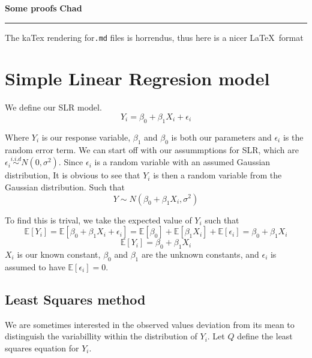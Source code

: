 \documentclass{article}
\begin{document}
 \hfill \textbf{\huge Some proofs}   \hfill  \textbf{\large 
	Chad } 
	\rule{19.5cm}{0.8pt} 


	The kaTex rendering for\verb|.md| files is horrendus, 
	thus here is a nicer \LaTeX \ format 

	
\section{Simple Linear Regresion model}
	
	We define our SLR model. 
\begin{equation}
 Y_i = \beta_0 + \beta_1X_i + \epsilon_i
\end{equation}
	
\noindent Where $Y_i$ is our response variable, $\beta_1$ and $\beta_0$ is both 
our parameters and $\epsilon_i$ is the random error term.
We can start off with our assummptions for SLR, 
which are $\epsilon_i \overset{i.i.d}{\sim} N(0, \sigma^2)$. Since $\epsilon_i$ is a
random variable with an assumed Gaussian distribution, It is obvious to see that $Y_i$ 
is then a random variable from the Gaussian distribution. Such that
\begin{equation} \tag{1.2}
Y \sim N(\beta_0 + \beta_1X_i, \sigma^2)
\end{equation}

\noindent To find this is trival, we take the expected value of $Y_i$ such that 
$$\mathbb{E}[Y_i]= \mathbb{E}[\beta_0 + \beta_1X_i + \epsilon_i]
= \mathbb{E}[\beta_0] + \mathbb{E}[\beta_1X_i] + \mathbb{E}[\epsilon_i] = 
\beta_0 + \beta_1X_i
$$
\begin{equation} \tag{1.3}
	\mathbb{E}[Y_i] = \beta_0 + \beta_1X_i 
\end{equation}
$X_i$ is our known constant, $\beta_0$ and $\beta_1$ are the unknown constants, and
$\epsilon_i$ is assumed to have $\mathbb{E}[\epsilon_i] = 0$. 

\subsection{Least Squares method} 
	
\noindent We are sometimes interested in the observed values deviation 
	from its mean to distinguish the variabillity 
	within the distribution of $Y_i$. Let $Q$ define the least squares equation 
	for $Y_i$.
\end{document}
